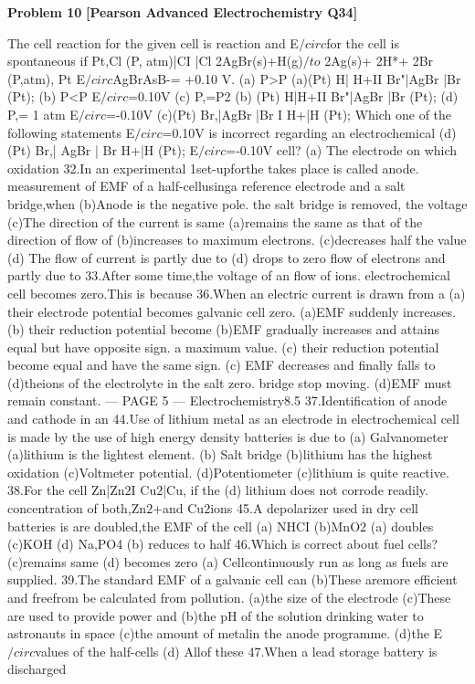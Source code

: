 \begin{problembox}
\textbf{Problem 10} \hfill \textbf{[Pearson Advanced Electrochemistry Q34]}
\label{q:ext-pearson-10}

The cell reaction for the given cell is
reaction and E$/circ$for the cell is
spontaneous if Pt,Cl (P, atm)|CI |Cl
2AgBr(s)+H(g)$/to$ 2Ag(s)+ 2H*+ 2Br
(P,atm), Pt
E$/circ$AgBrAsB-= +0.10 V.
(a) P>P
(a)(Pt) H| H+II Br"|AgBr |Br (Pt);
(b) P<P
E$/circ$=0.10V
(c) P,=P2
(b) (Pt) H|H+II Br"|AgBr |Br (Pt);
(d) P,= 1 atm
E$/circ$=-0.10V
(c)(Pt) Br,|AgBr |Br I H+|H (Pt);
Which one of the following statements
E$/circ$=0.10V
is incorrect regarding an electrochemical
(d) (Pt) Br,| AgBr | Br  H+|H (Pt);
E$/circ$=-0.10V
cell?
(a) The electrode on which oxidation
32.In an experimental
1set-upforthe
takes place is called anode.
measurement of EMF of a half-cellusinga
reference electrode and a salt bridge,when
(b)Anode is the negative pole.
the salt bridge is removed, the voltage
(c)The direction of the current is same
(a)remains the same
as that of the direction of flow of
(b)increases to maximum
electrons.
(c)decreases half the value
(d) The flow of current is partly due to
(d) drops to zero
flow of electrons and partly due to
33.After some time,the voltage of an
flow of ions.
electrochemical cell becomes zero.This is
because
36.When an electric current is drawn from a
(a) their electrode potential becomes
galvanic cell
zero.
(a)EMF suddenly increases.
(b) their reduction potential become
(b)EMF gradually increases and attains
equal but have opposite sign.
a maximum value.
(c) their reduction potential become
equal and have the same sign.
(c) EMF decreases and finally falls to
(d)theions of the electrolyte in the salt
zero.
bridge stop moving.
(d)EMF must remain constant.
--- PAGE 5 ---
Electrochemistry8.5
37.Identification of anode and cathode in an
44.Use of lithium metal as an electrode in
electrochemical cell is made by the use of
high energy density batteries is due to
(a) Galvanometer
(a)lithium is the lightest element.
(b) Salt bridge
(b)lithium has the highest oxidation
(c)Voltmeter
potential.
(d)Potentiometer
(c)lithium is quite reactive.
38.For the cell Zn|Zn$2$I Cu$2$|Cu, if the
(d) lithium does not corrode readily.
concentration of both,Zn$2$+and Cu$2$ions
45.A depolarizer used in dry cell batteries is
are doubled,the EMF of the cell
(a) NHCI
(b)MnO2
(a) doubles
(c)KOH
(d) Na,PO4
(b) reduces to half
46.Which is correct about fuel cells?
(c)remains same
(d) becomes zero
(a) Cellcontinuously run as long as fuels
are supplied.
39.The standard EMF of a galvanic cell can
(b)These aremore efficient and freefrom
be calculated from
pollution.
(a)the size of the electrode
(c)These are used to provide power and
(b)the pH of the solution
drinking water to astronauts in space
(c)the amount of metalin the anode
programme.
(d)the E$/circ$values of the half-cells
(d) Allof these
47.When a lead storage battery is discharged
\end{problembox}


